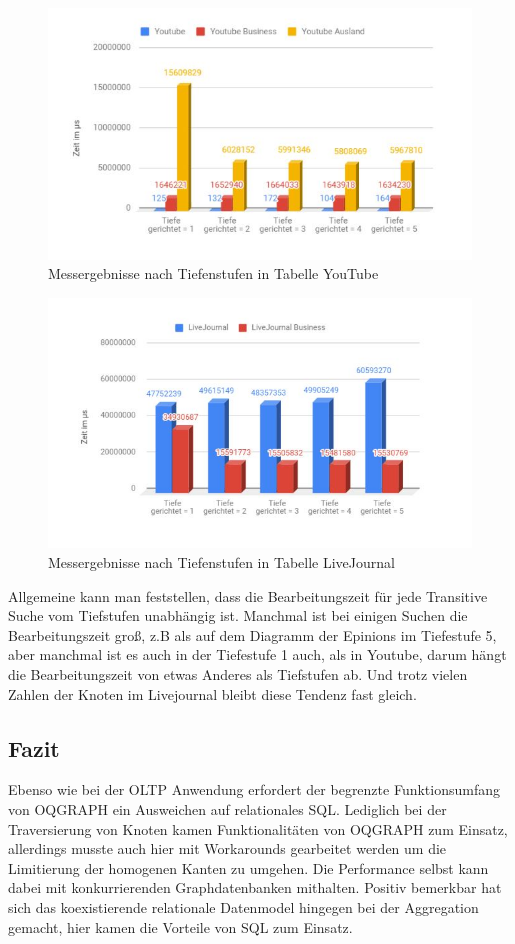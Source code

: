 \begin{figure}
	\centering
	\includegraphics[width=\textwidth]{images/youtub.jpg}
	\caption{Messergebnisse nach Tiefenstufen in Tabelle YouTube}
	\label{fig:youtub}
\end{figure}

\begin{figure}
	\centering
	\includegraphics[width=\textwidth]{images/LiJou.jpg}
	\caption{Messergebnisse nach Tiefenstufen in Tabelle LiveJournal}
	\label{fig:LiJou}
\end{figure}

Allgemeine kann man feststellen, dass die Bearbeitungszeit für jede Transitive Suche vom Tiefstufen unabhängig ist. Manchmal ist bei einigen Suchen die Bearbeitungszeit groß,  z.B als auf dem Diagramm der Epinions im Tiefestufe 5, aber manchmal ist es auch in der Tiefestufe 1 auch, als in Youtube, darum hängt die Bearbeitungszeit von etwas Anderes als Tiefstufen ab. Und trotz vielen Zahlen der Knoten im Livejournal bleibt diese Tendenz fast gleich.

\subsection{Fazit}
Ebenso wie bei der OLTP Anwendung erfordert der begrenzte Funktionsumfang von OQGRAPH ein Ausweichen auf relationales SQL. Lediglich bei der Traversierung von Knoten kamen Funktionalitäten von OQGRAPH zum Einsatz, allerdings musste auch hier mit Workarounds gearbeitet werden um die Limitierung der homogenen Kanten zu umgehen. Die Performance selbst kann dabei mit konkurrierenden Graphdatenbanken mithalten. Positiv bemerkbar hat sich das koexistierende relationale Datenmodel hingegen bei der Aggregation gemacht, hier kamen die Vorteile von SQL zum Einsatz.
